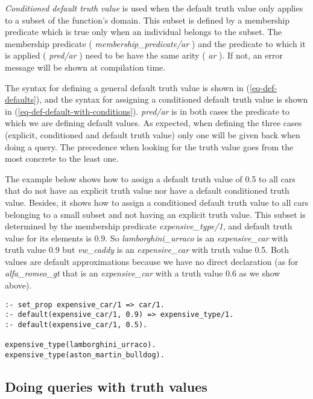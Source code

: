 \documentclass[runningheads,a4paper]{llncs}
\begin{document}
{\it Conditioned default truth value} is used when the default truth value 
only applies to a subset of the function's domain.
This subset is defined by a membership predicate which is true 
only when an individual belongs to the subset.
The membership predicate ( {\it membership\_predicate/ar} ) 
and the predicate to which it is applied ( {\it pred/ar} ) 
need to be have the same arity ( {\it ar} ). 
If not, an error message will be shown at compilation time.

The syntax for defining a general default truth value 
is shown in (\ref{eq-def-defaults}),
and the syntax for assigning a conditioned default truth value  
is shown in (\ref{eq-def-default-with-conditions}).
{\it pred/ar} is in both cases the predicate to which we are
defining default values.
As expected, when defining the three cases (explicit, conditioned
and default truth value) only one will be given back when doing
a query. The precedence when looking for the truth value 
goes from the most concrete to the least one.



The example below shows how to assign a default truth value of 0.5 
to all cars that do not have an explicit truth value nor have
a default conditioned truth value. 
Besides, it shows how to assign a conditioned default truth value 
to all cars belonging to a small subset and not having an explicit
truth value. 
This subset is determined by the membership predicate 
{\it expensive\_type/1}, 
and default truth value for its elements is 0.9.
So {\it lamborghini\_urraco} is an {\it
expensive\_car} with truth value 0.9 but {\it vw\_caddy} is an {\it
expensive\_car} with truth value 0.5. Both values are default
approximations because we have no direct declaration (as for {\it
alfa\_romeo\_gt} that is an {\it expensive\_car} with a truth value
0.6 as we show above).

\begin{verbatim}
:- set_prop expensive_car/1 => car/1.
:- default(expensive_car/1, 0.9) => expensive_type/1.
:- default(expensive_car/1, 0.5).

expensive_type(lamborghini_urraco).
expensive_type(aston_martin_bulldog).
\end{verbatim}

\subsection{Doing queries with truth values}
\label{doing-queries-with-truth-values}
\end{document}

